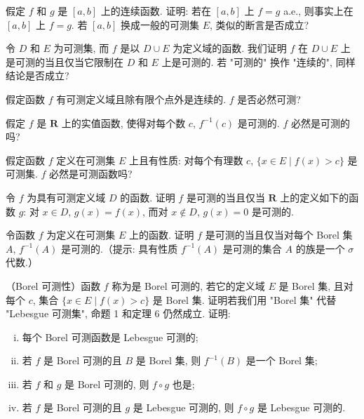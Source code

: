 \documentclass[../../main.tex]{subfiles}
\begin{document}
\begin{exercise}\label{exercise:ch03-01}
假定 $f$ 和 $g$ 是 $[a,b]$ 上的连续函数. 证明: 若在 $[a,b]$ 上 $f=g$ a.e., 则事实上在 $[a,b]$ 上 $f=g$. 若 $[a,b]$ 换成一般的可测集 $E$, 类似的断言是否成立?
\end{exercise}

\begin{exercise}\label{exercise:ch03-02}
令 $D$ 和 $E$ 为可测集, 而 $f$ 是以 $D\cup E$ 为定义域的函数. 我们证明 $f$ 在 $D\cup E$ 上是可测的当且仅当它限制在 $D$ 和 $E$ 上是可测的. 若 "可测的" 换作 "连续的", 同样结论是否成立?
\end{exercise}

\begin{exercise}\label{exercise:ch03-03}
假定函数 $f$ 有可测定义域且除有限个点外是连续的. $f$ 是否必然可测?
\end{exercise}

\begin{exercise}\label{exercise:ch03-04}
假定 $f$ 是 $\mathbf{R}$ 上的实值函数, 使得对每个数 $c$, $f^{-1}(c)$ 是可测的. $f$ 必然是可测的吗?
\end{exercise}

\begin{exercise}\label{exercise:ch03-05}
假定函数 $f$ 定义在可测集 $E$ 上且有性质: 对每个有理数 $c$, $\{x\in E\mid f(x)>c\}$ 是可测集. $f$ 必然是可测函数吗?
\end{exercise}

\begin{exercise}\label{exercise:ch03-06}
令 $f$ 为具有可测定义域 $D$ 的函数. 证明 $f$ 是可测的当且仅当 $\mathbf{R}$ 上的定义如下的函数 $g$: 对 $x\in D$, $g(x)=f(x)$, 而对 $x\notin D$, $g(x)=0$ 是可测的.
\end{exercise}

\begin{exercise}\label{exercise:ch03-07}
令函数 $f$ 为定义在可测集 $E$ 上的函数. 证明 $f$ 是可测的当且仅当对每个 Borel 集 $A$, $f^{-1}(A)$ 是可测的.（提示: 具有性质 $f^{-1}(A)$ 是可测的集合 $A$ 的族是一个 $\sigma$ 代数.）
\end{exercise}

\begin{exercise}\label{exercise:ch03-08}
（Borel 可测性）函数 $f$ 称为是 Borel 可测的, 若它的定义域 $E$ 是 Borel 集, 且对每个 $c$, 集合 $\{x\in E\mid f(x)>c\}$ 是 Borel 集. 证明若我们用 "Borel 集" 代替 "Lebesgue 可测集", 命题 1 和定理 6 仍然成立. 证明:
\begin{enumerate}[(i)]
\item 每个 Borel 可测函数是 Lebesgue 可测的;
\item 若 $f$ 是 Borel 可测的且 $B$ 是 Borel 集, 则 $f^{-1}(B)$ 是一个 Borel 集;
\item 若 $f$ 和 $g$ 是 Borel 可测的, 则 $f\circ g$ 也是;
\item 若 $f$ 是 Borel 可测的且 $g$ 是 Lebesgue 可测的, 则 $f\circ g$ 是 Lebesgue 可测的.
\end{enumerate}
\end{exercise}
\end{document}
